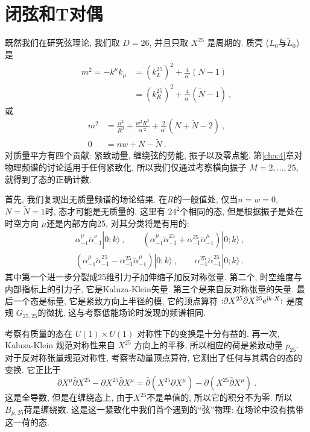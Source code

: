 \section{闭弦和T对偶} \label{sec:8.3}%

既然我们在研究弦理论, 我们取 $D=26$, 并且只取 $X^{25}$ 是周期的. 质壳 ($L_{0}$与$\tilde{L}_{0}$) 是
	\begin{align}
		m^{2}=-k^{\mu} k_{\mu} &= (k_{L}^{25})^{2}+\frac{4}{\alpha^{\prime}}(N-1) \nonumber \\
		&=(k_{R}^{25})^{2}+\frac{4}{\alpha^{\prime}}(\tilde{N}-1) \:, \label{8.3.1}
	\end{align}
或
\begin{subequations} \label{8.3.2}
\begin{align}
m^{2} &= \frac{n^{2}}{R^{2}}+\frac{w^{2} R^{2}}{\alpha^{\prime 2}}+\frac{2}{\alpha^{\prime}}(N+\tilde{N}-2) \:, \label{8.3.2a} \\
0 &= n w+N-\tilde{N} \:. \label{8.3.2b} 
\end{align}
\end{subequations}
对质量平方有四个贡献: 紧致动量, 缠绕弦的势能, 振子以及零点能. 第\ref{cha:4}章对物理频谱的讨论适用于任何紧致化, 
所以我们仅通过考察横向振子 $M=2, \ldots, 25$, 就得到了态的正确计数.

首先, 我们复现出无质量频谱的场论结果. 在$R$的一般值处, 仅当$n=w=0$, $N=\tilde{N}=1$时, 态才可能是无质量的. 这里有 $24^{2}$个相同的态, 但是根据振子是处在时空方向 $\mu$还是内部方向25, 对其分类将是有用的:
\begin{align}
	&\alpha_{-1}^{\mu} \tilde{\alpha}_{-1}^{\nu}|0 ; k\rangle\:, \qquad 
	(\alpha_{-1}^{\mu} \tilde{\alpha}_{-1}^{25}+\alpha_{-1}^{25} \tilde{\alpha}_{-1}^{\mu})|0 ; k\rangle \:, \nonumber \\
	&(\alpha_{-1}^{\mu} \tilde{\alpha}_{-1}^{25}-\alpha_{-1}^{25} \tilde{\alpha}_{-1}^{\mu})|0 ; k\rangle\:, \qquad 
	\alpha_{-1}^{25} \tilde{\alpha}_{-1}^{25}|0 ; k\rangle \:. \label{8.3.3}
\end{align}
其中第一个进一步分裂成25维引力子加伸缩子加反对称张量. 第二个, 时空维度与内部指标上的引力子, 它是Kaluza-Klein矢量. 第三个是来自反对称张量的矢量. 
最后一个态是标量, 它是紧致方向上半径的模, 它的顶点算符 $:\mathrel{\partial X^{25} \bar{\partial} X^{25} \mathrm{e}^{\mathrm{i} k \cdot X}}:$ 是度规 $G_{25,25}$的微扰. 这与考察低能场论时发现的频谱相同.

考察有质量的态在 $U(1) \times U(1)$ 对称性下的变换是十分有益的. 再一次, Kaluza-Klein 规范对称性来自 $X^{25}$ 方向上的平移, 
所以相应的荷是紧致动量 $p_{25} $. 对于反对称张量规范对称性, 考察零动量顶点算符, 它测出了任何与其耦合的态的变换. 它正比于
\begin{equation}
	\partial X^{\mu} \bar{\partial} X^{25}-\partial X^{25} \bar{\partial} X^{\mu}= 
	\bar{\partial}(X^{25} \partial X^{\mu})-\partial(X^{25} \bar{\partial} X^{\mu}) \:. \label{8.3.4}
\end{equation}
这是全导数, 但是在缠绕态上, 由于$X^{25}$不是单值的, 所以它的积分不为零. 所以 $B_{\mu, 25}$荷是缠绕数. 
这是这一紧致化中我们首个遇到的``弦''物理: 在场论中没有携带这一荷的态.

